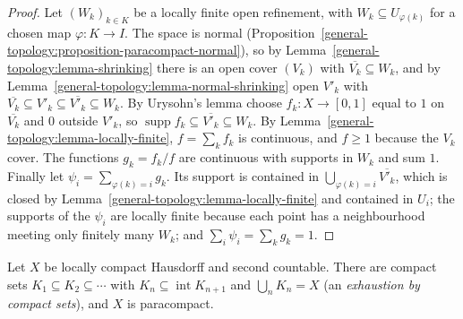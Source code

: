 \begin{proof}
Let $(W_k)_{k \in K}$ be a locally finite open refinement, with $W_k \subseteq U_{\varphi(k)}$ for a chosen map $\varphi \colon K \to I$. The space is normal
(Proposition~\ref{general-topology:proposition-paracompact-normal}), so by Lemma~\ref{general-topology:lemma-shrinking} there is an open cover $(V_k)$ with
$\overline{V_k} \subseteq W_k$, and by Lemma~\ref{general-topology:lemma-normal-shrinking} open $V'_k$ with
$\overline{V_k} \subseteq V'_k \subseteq \overline{V'_k} \subseteq W_k$. By Urysohn's lemma choose $f_k \colon X \to [0, 1]$ equal to $1$ on $\overline{V_k}$ and $0$
outside $V'_k$, so $\operatorname{supp} f_k \subseteq \overline{V'_k} \subseteq W_k$. By Lemma~\ref{general-topology:lemma-locally-finite}, $f = \sum_k f_k$ is continuous,
and $f \geq 1$ because the $V_k$ cover. The functions $g_k = f_k/f$ are continuous with supports in $W_k$ and sum $1$. Finally let
$\psi_i = \sum_{\varphi(k) = i} g_k$. Its support is contained in $\bigcup_{\varphi(k) = i}\overline{V'_k}$, which is closed by
Lemma~\ref{general-topology:lemma-locally-finite} and contained in $U_i$; the supports of the $\psi_i$ are locally finite because each point has a neighbourhood
meeting only finitely many $W_k$; and $\sum_i \psi_i = \sum_k g_k = 1$.
\end{proof}

\begin{proposition}\label{general-topology:proposition-exhaustion}
Let $X$ be locally compact Hausdorff and second countable. There are compact sets $K_1 \subseteq K_2 \subseteq \cdots$ with
$K_n \subseteq \operatorname{int} K_{n+1}$ and $\bigcup_n K_n = X$ (an \emph{exhaustion by compact sets}), and $X$ is paracompact.
\end{proposition}

